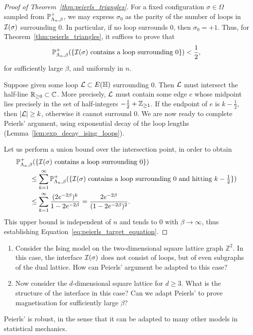 \begin{proof}[Proof of Theorem~\ref{thm:peierls_triangles}]
    For a fixed configuration $\sigma\in\Omega$
    sampled from $\P_{\Lambda_n,\beta}^+$,
    we may express $\sigma_0$ as the parity of the number
    of loops in $\calI(\sigma)$ surrounding $0$.
    In particular, if no loop surrounds $0$,
    then $\sigma_0=+1$.
    Thus, for Theorem~\ref{thm:peierls_triangles},
    it suffices to prove that
    \begin{equation}
        \label{eq:peierls_target_equation}
        \P_{\Lambda_n,\beta}^+
        (\{\text{$\calI(\sigma)$ contains a loop surrounding $0$}\})
        <\frac12,
    \end{equation}
    for sufficiently large $\beta$,
    and uniformly in $n$.

    Suppose given some loop $\calL\subset E(\H)$ surrounding $0$.
    Then $\calL$ must intersect the half-line $\R_{\geq 0}\subset\C$.
    More precisely, $\calL$ must contain some edge $e$ whose midpoint
    lies precisely in the set of half-integers $-\frac12+\Z_{\geq 1}$.
    If the endpoint of $e$ is $k-\frac12$, then
    $|\calL|\geq k$, otherwise it cannot surround $0$.
    We are now ready to complete Peierls' argument,
    using exponential decay of the loop lengths (Lemma~\ref{lem:exp_decay_ising_loops}).
    
    Let us perform a union bound over the intersection point,
    in order to obtain
    \begin{align}
        &\P_{\Lambda_n,\beta}^+
        (\{\text{$\calI(\sigma)$ contains a loop surrounding $0$}\})
        \\
        &\qquad\leq
        \sum_{k=1}^\infty
        \P_{\Lambda_n,\beta}^+
        (\{\text{$\calI(\sigma)$ contains a loop surrounding $0$ and hitting $k-\tfrac12$}\})
        \\
        &\qquad\leq
        \sum_{k=1}^\infty
        \frac{(2e^{-2\beta})^k}{1-2e^{-2\beta}}
        =
        \frac{2e^{-2\beta}}{(1-2e^{-2\beta})^2}.
    \end{align}
    This upper bound is independent of $n$
    and tends to $0$ with $\beta\to\infty$,
    thus establishing Equation~\eqref{eq:peierls_target_equation}.
\end{proof}

\begin{exercise}
    \begin{enumerate}
        \item     Consider the Ising model on the two-dimensional square lattice graph $\mathbb{Z}^2$.
        In this case, the interface $\calI(\sigma)$ does not consist of loops, but of even subgraphs
        of the dual lattice.
        How can Peierls' argument be adapted to this case?
        \item  Now consider the $d$-dimensional square lattice for $d\geq 3$.
        What is the structure of the interface in this case?
        Can we adapt Peierls' to prove magnetisation for sufficiently large $\beta$?
    \end{enumerate}
\end{exercise}

\begin{remark}
    Peierls' is robust,
    in the sense that it can be adapted to many other models in statistical mechanics.
\end{remark}
